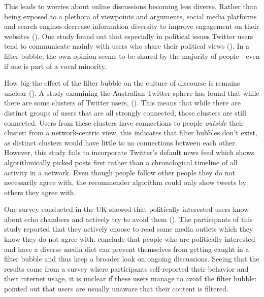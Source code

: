 This leads to worries about online discussions becoming less diverse. Rather than being exposed to a plethora of viewpoints and arguments, social media platforms and search engines decrease information diversity to improve engagement on their websites (\cite{bozdagBreakingFilterBubble2015}). One study found out that especially in political issues Twitter users tend to communicate mainly with users who share their political views (\cite{barberaTweetingLeftRight2015}). In a filter bubble, the own opinion seems to be shared by the majority of people---even if one is part of a vocal minority.

How big the effect of the filter bubble on the culture of discourse is remains unclear (\cite{brunsEchoChamberWhat2017}). A study examining the Australian Twitter-sphere has found that while there are some clusters of Twitter users,  (\cite[9]{brunsEchoChamberWhat2017}). This means that while there are distinct groups of users that are all strongly connected, those clusters are still connected. Users from these clusters have connections to people \emph{outside} their cluster: from a network-centric view, this indicates that filter bubbles don't exist, as distinct clusters would have little to no connections between each other. However, this study fails to incorporate Twitter's default news feed which shows algorithmically picked posts first rather than a chronological timeline of all activity in a network. Even though people follow other people they do not necessarily agree with, the recommender algorithm could only show tweets by others they agree with.

One survey conducted in the UK showed that politically interested users know about echo chambers and actively try to avoid them (\cite{duboisEchoChamberOverstated2018}). The participants of this study reported that they actively choose to read some media outlets which they know they do not agree with. \citeauthor{duboisEchoChamberOverstated2018} conclude that people who are politically interested and have a diverse media diet can prevent themselves from getting caught in a filter bubble and thus keep a broader look on ongoing discussions. Seeing that the results come from a survey where participants self-reported their behavior and their internet usage, it is unclear if these users manage to avoid the filter bubble: \citeauthor{bozdagBreakingFilterBubble2015} pointed out that users are usually unaware that their content is filtered. 

